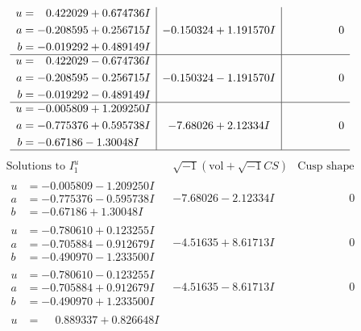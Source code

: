 \documentclass[1p]{elsarticle_modified}
\theoremstyle{definition}
\newcommand{\I}{\sqrt{-1}}
\begin{document}
$$\begin{array}{c|c|c}
\begin{aligned}
u &= \phantom{-}0.422029 + 0.674736 I \\
a &= -0.208595 + 0.256715 I \\
b &= -0.019292 + 0.489149 I\end{aligned}
 & -0.150324 + 1.191570 I & \phantom{-0.000000 } 0 \\ \hline\begin{aligned}
u &= \phantom{-}0.422029 - 0.674736 I \\
a &= -0.208595 - 0.256715 I \\
b &= -0.019292 - 0.489149 I\end{aligned}
 & -0.150324 - 1.191570 I & \phantom{-0.000000 } 0 \\ \hline\begin{aligned}
u &= -0.005809 + 1.209250 I \\
a &= -0.775376 + 0.595738 I \\
b &= -0.67186 - 1.30048 I\end{aligned}
 & -7.68026 + 2.12334 I & \phantom{-0.000000 } 0\\
 \hline 
 \end{array}$$\newpage$$\begin{array}{c|c|c}  
\text{Solutions to }I^u_{1}& \I (\text{vol} + \sqrt{-1}CS) & \text{Cusp shape}\\
 \hline 
\begin{aligned}
u &= -0.005809 - 1.209250 I \\
a &= -0.775376 - 0.595738 I \\
b &= -0.67186 + 1.30048 I\end{aligned}
 & -7.68026 - 2.12334 I & \phantom{-0.000000 } 0 \\ \hline\begin{aligned}
u &= -0.780610 + 0.123255 I \\
a &= -0.705884 - 0.912679 I \\
b &= -0.490970 - 1.233500 I\end{aligned}
 & -4.51635 + 8.61713 I & \phantom{-0.000000 } 0 \\ \hline\begin{aligned}
u &= -0.780610 - 0.123255 I \\
a &= -0.705884 + 0.912679 I \\
b &= -0.490970 + 1.233500 I\end{aligned}
 & -4.51635 - 8.61713 I & \phantom{-0.000000 } 0 \\ \hline\begin{aligned}
u &= \phantom{-}0.889337 + 0.826648 I \\

\end{aligned}
\end{array}$$
\end{document}
